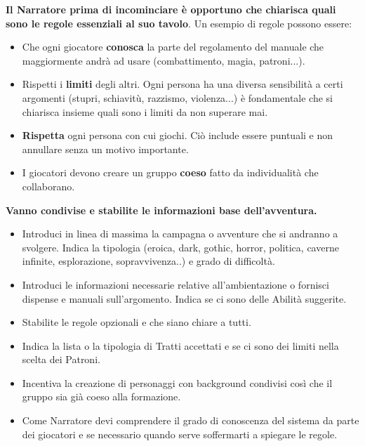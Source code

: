 \begin{multicols}{2}
\textbf{Il Narratore prima di incominciare è opportuno che chiarisca quali sono le regole essenziali al suo tavolo}. Un esempio di regole possono essere:

\begin{itemize}[leftmargin=*] \setlength{\itemsep}{0pt}

\item Che ogni giocatore \textbf{conosca} la parte del regolamento del manuale che maggiormente andrà ad usare (combattimento, magia, patroni...).
\item Rispetti i \textbf{limiti} degli altri. Ogni persona ha una diversa sensibilità a certi argomenti (stupri, schiavitù, razzismo, violenza...) è fondamentale che si chiarisca insieme quali sono i limiti da non superare mai.
\item \textbf{Rispetta} ogni persona con cui giochi. Ciò include essere puntuali e non annullare senza un motivo importante.
\item I giocatori devono creare un gruppo \textbf{coeso} fatto da individualità che collaborano.
\end{itemize}

\textbf{Vanno condivise e stabilite le informazioni base dell'avventura.}

\medskip

\begin{itemize}[leftmargin=*] \setlength{\itemsep}{0pt}
\item Introduci in linea di massima la campagna o avventure che si andranno a svolgere. Indica la tipologia (eroica, dark, gothic, horror, politica, caverne infinite, esplorazione, sopravvivenza..) e grado di difficoltà.
\item Introduci le informazioni necessarie relative all'ambientazione o fornisci dispense e manuali sull'argomento. Indica se ci sono delle Abilità suggerite.
\item Stabilite le regole opzionali e che siano chiare a tutti.
\item Indica la lista o la tipologia di Tratti accettati e se ci sono dei limiti nella scelta dei Patroni.
\item Incentiva la creazione di personaggi con background condivisi così che il gruppo sia già coeso alla formazione.
\item Come Narratore devi comprendere il grado di conoscenza del sistema da parte dei giocatori e se necessario quando serve soffermarti a spiegare le regole.
\end{itemize}


\end{multicols}
